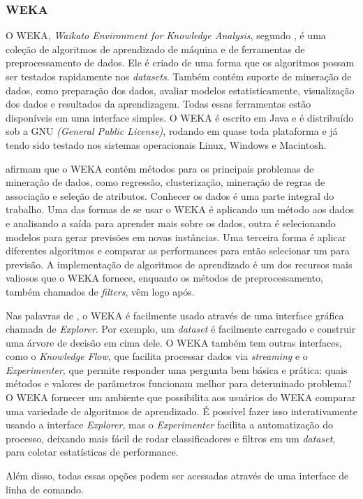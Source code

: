 \subsubsection{WEKA}

O WEKA, \textit{Waikato Environment for Knowledge Analysis}, segundo , é uma coleção de algoritmos de aprendizado de máquina e de ferramentas de preprocessamento de dados. Ele é criado de uma forma que os algoritmos possam ser testados rapidamente nos \textit{datasets}. Também contém suporte de mineração de dados, como preparação dos dados, avaliar modelos estatisticamente, visualização dos dados e resultados da aprendizagem. Todas essas ferramentas estão disponíveis em uma interface simples. O WEKA é escrito em Java e é distribuído sob a GNU \textit{(General Public License)}, rodando em quase toda plataforma e já tendo sido testado nos sistemas operacionais Linux, Windows e Macintosh.

 afirmam que o WEKA contém métodos para os principais problemas de mineração de dados, como regressão, clusterização, mineração de regras de associação e seleção de atributos. Conhecer os dados é uma parte integral do trabalho. Uma das formas de se usar o WEKA é aplicando um método aos dados e analisando a saída para aprender mais sobre os dados, outra é selecionando modelos para gerar previsões em novas instâncias. Uma terceira forma é aplicar diferentes algoritmos e comparar as performances para então selecionar um para previsão. A implementação de algoritmos de aprendizado é um dos recursos mais valiosos que o WEKA fornece, enquanto os métodos de preprocessamento, também chamados de \textit{filters}, vêm logo após. 

Nas palavras de , o WEKA é facilmente usado através de uma interface gráfica chamada de \textit{Explorer}. Por exemplo, um \textit{dataset} é facilmente carregado e construir uma árvore de decisão em cima dele. O WEKA também tem outras interfaces, como o \textit{Knowledge Flow}, que facilita processar dados via \textit{streaming} e o \textit{Experimenter}, que permite responder uma pergunta bem básica e prática: quais métodos e valores de parâmetros funcionam melhor para determinado problema? O WEKA fornecer um ambiente que possibilita aos usuários do WEKA comparar uma variedade de algoritmos de aprendizado. É possível fazer isso interativamente usando a  interface \textit{Explorer}, mas o \textit{Experimenter} facilita a automatização do processo, deixando mais fácil de rodar classificadores e filtros em um \textit{dataset}, para coletar estatísticas de performance.

Além disso, todas essas opções podem ser acessadas através de uma interface de linha de comando.